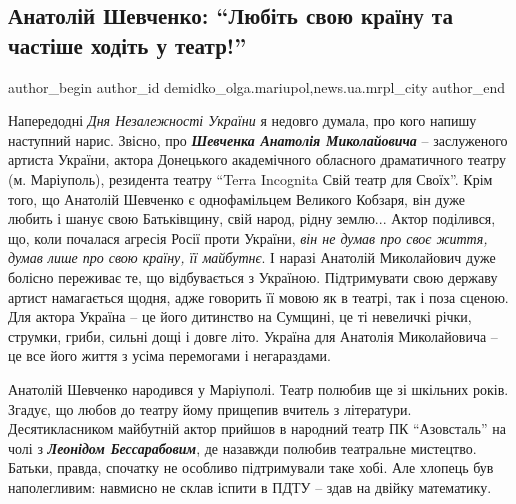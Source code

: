  
 
 
 
 
 
\subsection{Анатолій Шевченко: \enquote{Любіть свою країну та частіше ходіть у театр!}}
\label{sec:23_08_2021.stz.news.ua.mrpl_city.1.anatolij_shevchenko}
 
\ifcmt
 author_begin
   author_id demidko_olga.mariupol,news.ua.mrpl_city
 author_end
\fi


Напередодні \emph{Дня Незалежності України} я недовго думала, про кого напишу
наступний нарис. Звісно, про \emph{\textbf{Шевченка Анатолія Миколайовича}} – заслуженого
артиста України, актора Донецького академічного обласного драматичного театру
(м. Маріуполь), резидента театру \enquote{Terra Incognita Свій театр для Своїх}. Крім
того, що Анатолій Шевченко є однофамільцем Великого Кобзаря, він дуже любить і
шанує свою Батьківщину, свій народ, рідну землю... Актор поділився, що, коли
почалася агресія Росії проти України, \emph{він не думав про своє життя, думав лише
про свою країну, її майбутнє}. І наразі Анатолій Миколайович дуже болісно
переживає те, що відбувається з Україною. Підтримувати свою державу артист
намагається щодня, адже говорить її  мовою як в театрі, так і поза сценою. Для
актора Україна – це його дитинство на Сумщині, це ті невеличкі річки, струмки,
гриби, сильні дощі і довге літо. Україна для Анатолія Миколайовича – це все
його життя з усіма перемогами і негараздами.

Анатолій Шевченко народився у Маріуполі. Театр полюбив ще зі шкільних років.
Згадує, що любов до театру йому прищепив вчитель з літератури. Десятикласником
майбутній актор прийшов в народний театр ПК \enquote{Азовсталь} на чолі з \emph{\textbf{Леонідом
Бессарабовим}}, де назавжди полюбив театральне мистецтво. Батьки, правда,
спочатку не особливо підтримували таке хобі. Але хлопець був наполегливим:
навмисно не склав іспити в ПДТУ – здав на двійку математику.

